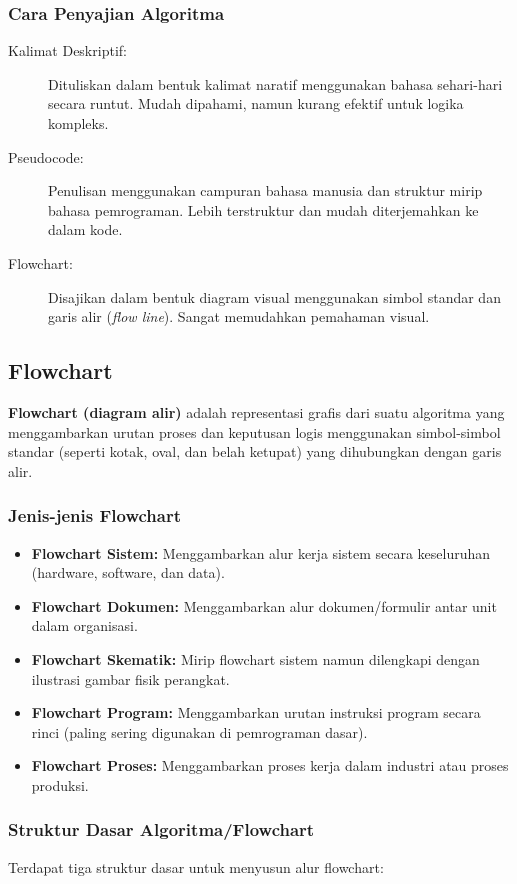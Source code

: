 \subsubsection{Cara Penyajian Algoritma}
\begin{description}
    \item[Kalimat Deskriptif:] Dituliskan dalam bentuk kalimat naratif menggunakan bahasa sehari-hari secara runtut. Mudah dipahami, namun kurang efektif untuk logika kompleks.
    \item[Pseudocode:] Penulisan menggunakan campuran bahasa manusia dan struktur mirip bahasa pemrograman. Lebih terstruktur dan mudah diterjemahkan ke dalam kode.
    \item[Flowchart:] Disajikan dalam bentuk diagram visual menggunakan simbol standar dan garis alir (\textit{flow line}). Sangat memudahkan pemahaman visual.
\end{description}

\subsection{Flowchart}
\textbf{Flowchart (diagram alir)} adalah representasi grafis dari suatu algoritma yang menggambarkan urutan proses dan keputusan logis menggunakan simbol-simbol standar (seperti kotak, oval, dan belah ketupat) yang dihubungkan dengan garis alir.

\subsubsection{Jenis-jenis Flowchart}
\begin{itemize}
    \item \textbf{Flowchart Sistem:} Menggambarkan alur kerja sistem secara keseluruhan (hardware, software, dan data).
    \item \textbf{Flowchart Dokumen:} Menggambarkan alur dokumen/formulir antar unit dalam organisasi.
    \item \textbf{Flowchart Skematik:} Mirip flowchart sistem namun dilengkapi dengan ilustrasi gambar fisik perangkat.
    \item \textbf{Flowchart Program:} Menggambarkan urutan instruksi program secara rinci (paling sering digunakan di pemrograman dasar).
    \item \textbf{Flowchart Proses:} Menggambarkan proses kerja dalam industri atau proses produksi.
\end{itemize}

\subsubsection{Struktur Dasar Algoritma/Flowchart}
Terdapat tiga struktur dasar untuk menyusun alur flowchart:

